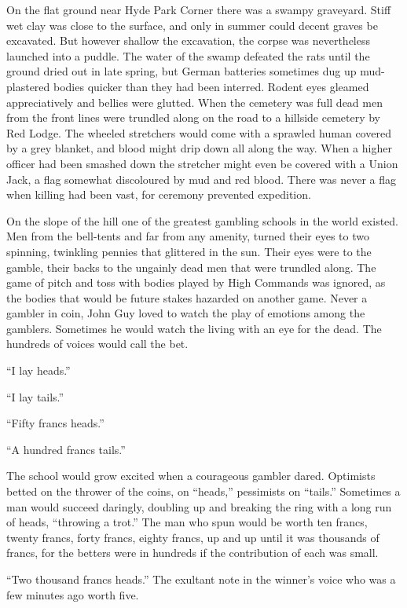 On the flat ground near Hyde Park Corner there was a swampy graveyard. Stiff wet clay was close to the surface, and only in summer could decent graves be excavated. But however shallow the excavation, the corpse was nevertheless launched into a puddle. The water of the swamp defeated the rats until the ground dried out in late spring, but German batteries sometimes dug up mud-plastered bodies quicker than they had been interred. Rodent eyes gleamed appreciatively and bellies were glutted. When the cemetery was full dead men from the front lines were trundled along on the road to a hillside cemetery by Red Lodge. The wheeled stretchers would come with a sprawled human covered by a grey blanket, and blood might drip down all along the way. When a higher officer had been smashed down the stretcher might even be covered with a Union Jack, a flag somewhat discoloured by mud and red blood. There was never a flag when killing had been vast, for ceremony prevented expedition.

On the slope of the hill one of the greatest gambling schools in the world existed. Men from the bell-tents and far from any amenity, turned their eyes to two spinning, twinkling pennies that glittered in the sun. Their eyes were to the gamble, their backs to the ungainly dead men that were trundled along. The game of pitch and toss with bodies played by High Commands was ignored, as the bodies that would be future stakes hazarded on another game. Never a gambler in coin, John Guy loved to watch the play of emotions among the gamblers. Sometimes he would watch the living with an eye for the dead. The hundreds of voices would call the bet.

``I lay heads.''

``I lay tails.''

``Fifty francs heads.''

``A hundred francs tails.''

The school would grow excited when a courageous gambler dared. Optimists betted on the thrower of the coins, on ``heads,'' pessimists on ``tails.'' Sometimes a man would succeed daringly, doubling up and breaking the ring with a long run of heads, ``throwing a trot.'' The man who spun would be worth ten francs, twenty francs, forty francs, eighty francs, up and up until it was thousands of francs, for the betters were in hundreds if the contribution of each was small.

``Two thousand francs heads.'' The exultant note in the winner's voice who was a few minutes ago worth five.

